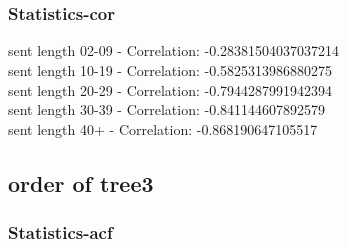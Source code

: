\documentclass{article}%
\begin{document}
\begin{figure}[ht]%
\centering%
\setlength{\abovecaptionskip}{-35pt}%
%
%
\\%
%
%
\\%
%
\end{figure}

%
\newpage%
\subsubsection{Statistics{-}cor}%
\label{ssubsec:Statistics{-}cor}%
\noindent%
sent length 02-09 - Correlation: -0.28381504037037214\\%
sent length 10-19 - Correlation: -0.5825313986880275\\%
sent length 20-29 - Correlation: -0.7944287991942394\\%
sent length 30-39 - Correlation: -0.841144607892579\\%
sent length 40+ - Correlation: -0.868190647105517\\

%
\newpage

%
\subsection{order of tree3}%
\label{subsec:orderoftree3}%
\subsubsection{Statistics{-}acf}%
\label{ssubsec:Statistics{-}acf}%
\end{document}
